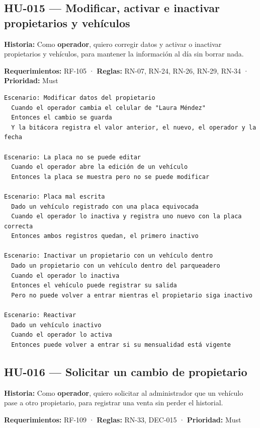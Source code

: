 \subsection{HU-015 — Modificar, activar e inactivar propietarios y vehículos}

\textbf{Historia:} Como \textbf{operador}, quiero corregir datos y activar o inactivar propietarios y vehículos, para mantener la información al día sin borrar nada.


\textbf{Requerimientos:} RF-105 · \textbf{Reglas:} RN-07, RN-24, RN-26, RN-29, RN-34 · \textbf{Prioridad:} Must


\begin{lstlisting}[style=gherkin]
Escenario: Modificar datos del propietario
  Cuando el operador cambia el celular de "Laura Méndez"
  Entonces el cambio se guarda
  Y la bitácora registra el valor anterior, el nuevo, el operador y la fecha

Escenario: La placa no se puede editar
  Cuando el operador abre la edición de un vehículo
  Entonces la placa se muestra pero no se puede modificar

Escenario: Placa mal escrita
  Dado un vehículo registrado con una placa equivocada
  Cuando el operador lo inactiva y registra uno nuevo con la placa correcta
  Entonces ambos registros quedan, el primero inactivo

Escenario: Inactivar un propietario con un vehículo dentro
  Dado un propietario con un vehículo dentro del parqueadero
  Cuando el operador lo inactiva
  Entonces el vehículo puede registrar su salida
  Pero no puede volver a entrar mientras el propietario siga inactivo

Escenario: Reactivar
  Dado un vehículo inactivo
  Cuando el operador lo activa
  Entonces puede volver a entrar si su mensualidad está vigente
\end{lstlisting}

\subsection{HU-016 — Solicitar un cambio de propietario}

\textbf{Historia:} Como \textbf{operador}, quiero solicitar al administrador que un vehículo pase a otro propietario, para registrar una venta sin perder el historial.


\textbf{Requerimientos:} RF-109 · \textbf{Reglas:} RN-33, DEC-015 · \textbf{Prioridad:} Must


